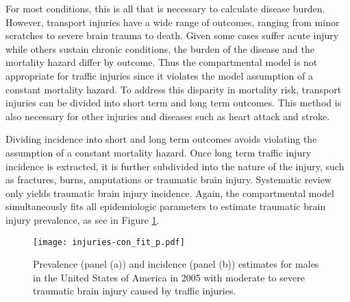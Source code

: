 For most conditions, this is all that is necessary to calculate disease burden.  However, transport injuries have a wide range of outcomes, ranging from minor scratches to severe brain trauma to death.  Given some cases suffer acute injury while others sustain chronic conditions, the burden of the disease and the mortality hazard differ by outcome.  Thus the compartmental model is not appropriate for traffic injuries since it violates the model assumption of a constant mortality hazard.  To address this disparity in mortality risk, transport injuries can be divided into short term and long term outcomes.  This method is also necessary for other injuries and diseases such as heart attack and stroke.

Dividing incidence into short and long term outcomes avoids violating the assumption of a constant mortality hazard.  Once long term traffic injury incidence is extracted, it is further subdivided into the nature of the injury, such as fractures, burns, amputations or traumatic brain injury.  Systematic review only yields traumatic brain injury incidence.  Again, the compartmental model simultaneously fits all epidemiologic parameters to estimate traumatic brain injury prevalence, as see in Figure \ref{fig:app-injury brain fit}.

    \begin{figure}[h]
        \begin{center}
            \texttt{[image: injuries-con\_fit\_p.pdf]}
            \caption{Prevalence (panel (a)) and incidence (panel (b)) estimates for males in the United States of America in 2005 with moderate to severe traumatic brain injury caused by traffic injuries.}
            \label{fig:app-injury brain fit}
        \end{center}
    \end{figure}



